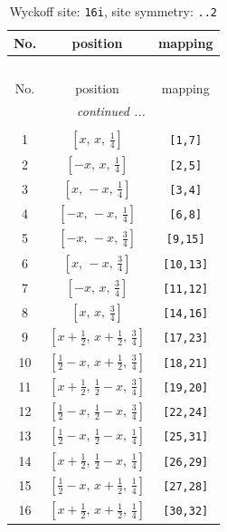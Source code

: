 \documentclass[fleqn,8pt]{jsarticle}
\begin{document}
\begin{longtable}{ccc}
\caption{Wyckoff site: {\tt 16i}, site symmetry: {\tt ..2}}
 \\
 \hline \hline
No. & position & mapping \\ \hline \endfirsthead

\multicolumn{2}{l}{\tablename\ \thetable{}} \\
 \hline \hline
No. & position & mapping \\ \hline \endhead

 \hline \hline
\multicolumn{2}{r}{\footnotesize\it continued ...} \\ \endfoot

 \hline \hline
\multicolumn{2}{r}{} \\ \endlastfoot

1 & $\left[ x,\, x,\, \frac{1}{4} \right]$ & {\tt [1,7]} \\ \hline
2 & $\left[ - x,\, x,\, \frac{1}{4} \right]$ & {\tt [2,5]} \\ \hline
3 & $\left[ x,\, - x,\, \frac{1}{4} \right]$ & {\tt [3,4]} \\ \hline
4 & $\left[ - x,\, - x,\, \frac{1}{4} \right]$ & {\tt [6,8]} \\ \hline
5 & $\left[ - x,\, - x,\, \frac{3}{4} \right]$ & {\tt [9,15]} \\ \hline
6 & $\left[ x,\, - x,\, \frac{3}{4} \right]$ & {\tt [10,13]} \\ \hline
7 & $\left[ - x,\, x,\, \frac{3}{4} \right]$ & {\tt [11,12]} \\ \hline
8 & $\left[ x,\, x,\, \frac{3}{4} \right]$ & {\tt [14,16]} \\ \hline
9 & $\left[ x + \frac{1}{2},\, x + \frac{1}{2},\, \frac{3}{4} \right]$ & {\tt [17,23]} \\ \hline
10 & $\left[ \frac{1}{2} - x,\, x + \frac{1}{2},\, \frac{3}{4} \right]$ & {\tt [18,21]} \\ \hline
11 & $\left[ x + \frac{1}{2},\, \frac{1}{2} - x,\, \frac{3}{4} \right]$ & {\tt [19,20]} \\ \hline
12 & $\left[ \frac{1}{2} - x,\, \frac{1}{2} - x,\, \frac{3}{4} \right]$ & {\tt [22,24]} \\ \hline
13 & $\left[ \frac{1}{2} - x,\, \frac{1}{2} - x,\, \frac{1}{4} \right]$ & {\tt [25,31]} \\ \hline
14 & $\left[ x + \frac{1}{2},\, \frac{1}{2} - x,\, \frac{1}{4} \right]$ & {\tt [26,29]} \\ \hline
15 & $\left[ \frac{1}{2} - x,\, x + \frac{1}{2},\, \frac{1}{4} \right]$ & {\tt [27,28]} \\ \hline
16 & $\left[ x + \frac{1}{2},\, x + \frac{1}{2},\, \frac{1}{4} \right]$ & {\tt [30,32]} \\
\end{longtable}
\end{document}
